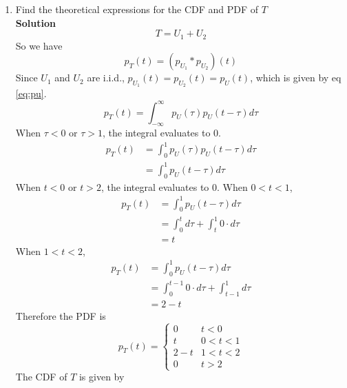 \documentclass[journal, 12pt, twocolumn]{IEEEtran}
\begin{document}
\begin{enumerate}[label=\arabic{section}.\arabic*]
    \item
        Find the theoretical expressions for the CDF and PDF of $T$
        \\
        \textbf{Solution}
        \begin{equation}
            T = U_1 + U_2
        \end{equation}
        So we have
        \begin{equation}
            p_T(t) = (p_{U_1} * p_{U_2})(t)
        \end{equation}
        Since $U_1$ and $U_2$ are i.i.d., $p_{U_1}(t)=p_{U_2}(t)=p_U(t)$, which is given by eq \eqref{eq:pu}.
        \begin{equation}
            p_T(t) = \int_{-\infty}^{\infty}p_U(\tau)p_U(t - \tau) d\tau
        \end{equation}
        When $\tau<0$ or $\tau>1$, the integral evaluates to 0.
        \begin{align}
            p_T(t) &= \int_{0}^{1}p_U(\tau)p_U(t - \tau) d\tau \\
                   &= \int_{0}^{1}p_U(t - \tau) d\tau
        \end{align}
        When $t<0$ or $t>2$, the integral evaluates to 0. When $0<t<1$,
        \begin{align}
            p_T(t) &= \int_{0}^{1}p_U(t - \tau) d\tau \\
                   &= \int_{0}^{t} d\tau + \int_{t}^{1}0 \cdot d\tau \\
                   &= t
        \end{align}
        When $1<t<2$,
        \begin{align}
            p_T(t) &= \int_{0}^{1}p_U(t - \tau) d\tau \\
                   &= \int_{0}^{t-1}0 \cdot d\tau + \int_{t-1}^{1} d\tau \\
                   &= 2 - t
        \end{align}
        Therefore the PDF is
        \begin{equation}
            p_T(t) = \begin{cases}
                0 & t < 0 \\
                t & 0 < t < 1 \\
                2 - t & 1 < t < 2 \\
                0 & t > 2
            \end{cases}
        \end{equation}
        The CDF of $T$ is given by
        \begin{equation}

\end{equation}
\end{enumerate}
\end{document}
